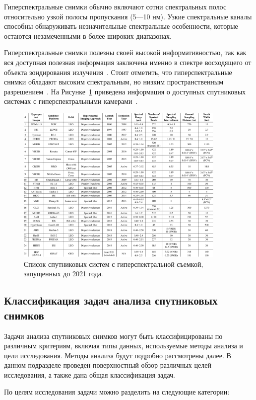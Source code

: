 \documentclass[14pt, russian]{scrartcl}
\begin{document}
Гиперспектральные снимки обычно включают сотни спектральных полос относительно узкой полосы пропускания (5—10 нм). Узкие спектральные каналы способны обнаруживать незначительные спектральные особенности, которые остаются незамеченными в более широких диапазонах.

Гиперспектральные снимки полезны своей высокой информативностью, так как вся доступная полезная информация заключена именно в спектре восходящего от объекта зондирования излучения~\cite{17}. Стоит отметить, что гиперспектральные снимки обладают высоким спектральным, но низким пространственным разрешением~\cite{18}. На Рисунке~\ref{fig::figure1} приведена информация о доступных спутниковых системах с гиперспектральными камерами~\cite{19}.

\begin{figure}[!htb]\centering
\includegraphics[width=0.9\textwidth]{img1.png}
\caption{Список спутниковых систем с гиперспектральной съемкой, запущенных до 2021 года.}
\label{fig::figure1}
\end{figure}

\subsection{Классификация задач анализа спутниковых снимков}

Задачи анализа спутниковых снимков могут быть классифицированы по различным критериям, включая типы данных, используемые методы анализа и цели исследования. Методы анализа будут подробно рассмотрены далее. В данном подразделе проведен поверхностный обзор различных целей исследования, а также дана общая классификация задач.

По целям исследования задачи можно разделить на следующие категории:
\end{document}
